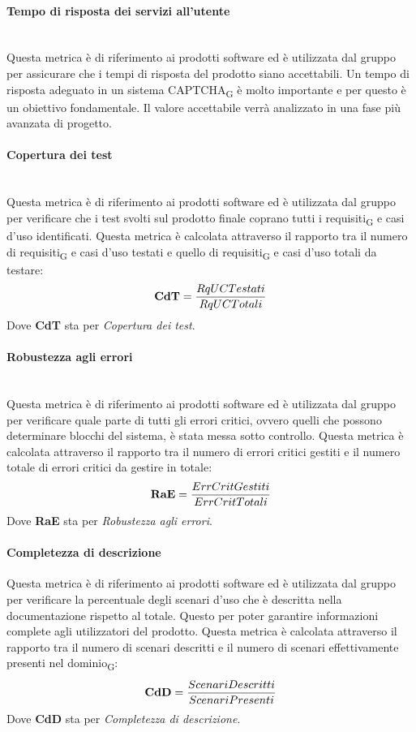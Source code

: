 \paragraph{Tempo di risposta dei servizi all'utente}\mbox{}\\
Questa metrica è di riferimento ai prodotti software ed è utilizzata dal gruppo per assicurare che i tempi di risposta del prodotto siano accettabili. Un tempo di risposta adeguato in un sistema CAPTCHA\textsubscript{G} è molto importante e per questo è un obiettivo fondamentale. Il valore accettabile verrà analizzato in una fase più avanzata di progetto.
\paragraph{Copertura dei test}\mbox{}\\
Questa metrica è di riferimento ai prodotti software ed è utilizzata dal gruppo per verificare che i test svolti sul prodotto finale coprano tutti i requisiti\textsubscript{G} e casi d’uso identificati. Questa metrica è calcolata attraverso il rapporto tra il numero di requisiti\textsubscript{G} e casi d'uso testati e quello di requisiti\textsubscript{G} e casi d'uso totali da testare:
\begin{align*}
	\centering
	\textbf{CdT} = \frac{RqUCTestati}{RqUCTotali}
\end{align*}
Dove \textbf{CdT} sta per \textit{Copertura dei test}.
\paragraph{Robustezza agli errori}\mbox{}\\
Questa metrica è di riferimento ai prodotti software ed è utilizzata dal gruppo per verificare quale parte di tutti gli errori critici, ovvero quelli che possono determinare blocchi del sistema, è stata messa sotto controllo. Questa metrica è calcolata attraverso il rapporto tra il numero di errori critici gestiti e il numero totale di errori critici da gestire in totale:
\begin{align*}
	\centering
	\textbf{RaE} = \frac{ErrCritGestiti}{ErrCritTotali}
\end{align*}
Dove \textbf{RaE} sta per \textit{Robustezza agli errori}.
\newpage
\paragraph{Completezza di descrizione}\mbox\\
Questa metrica è di riferimento ai prodotti software ed è utilizzata dal gruppo per verificare la percentuale degli scenari d’uso che è descritta nella documentazione rispetto al totale. Questo per poter garantire informazioni complete agli utilizzatori del prodotto. Questa metrica è calcolata attraverso il rapporto tra il numero di scenari descritti e il numero di scenari effettivamente presenti nel dominio\textsubscript{G}:
\begin{align*}
	\centering
	\textbf{CdD} = \frac{ScenariDescritti}{ScenariPresenti}
\end{align*}
Dove \textbf{CdD} sta per \textit{Completezza di descrizione}.
